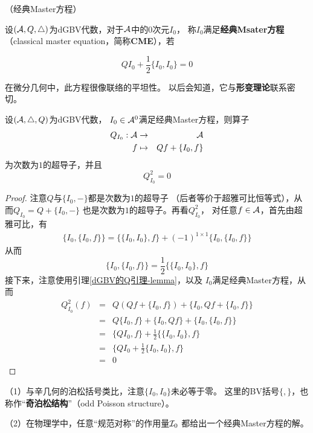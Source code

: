 \begin{definition}（经典Master方程）

设$(\mathcal{A},Q,\triangle)$为dGBV代数，对于$\mathcal{A}$中的$0$次元$I_0$，
称$I_0$满足\textbf{经典Msater方程}
（classical master equation，简称\textbf{CME}），若

$$QI_0+\frac{1}{2}\{I_0,I_0\}=0$$
\end{definition}

在微分几何中，此方程很像联络的平坦性。
以后会知道，它与\textbf{形变理论}联系密切。

\begin{lemma}
设$(\mathcal{A},\triangle,Q)$为dGBV代数，
$I_0\in\mathcal{A}^0$满足经典Master方程，则算子
\begin{eqnarray*}
Q_{I_0}:\mathcal{A}&\to&\mathcal{A}\\
f&\mapsto&Qf+\{I_0,f\}
\end{eqnarray*}
为次数为$1$的超导子，并且
$$Q_{I_0}^2=0$$
\end{lemma}

\begin{proof}
注意$Q$与$\{I_0,-\}$都是次数为$1$的超导子
（后者等价于超雅可比恒等式），从而$Q_{I_0}=Q+\{I_0,-\}$
也是次数为$1$的超导子。再看$Q_{I_0}^2$，
对任意$f\in\mathcal{A}$，首先由超雅可比，有
\begin{eqnarray*}
\{I_0,\{I_0,f\}\}=
\{\{I_0,I_0\},f\}+(-1)^{1\times 1}\{I_0,\{I_0,f\}\}
\end{eqnarray*}
从而
$$\{I_0,\{I_0,f\}\}=\frac{1}{2}\{\{I_0,I_0\},f\}$$
接下来，注意使用引理\ref{dGBV的Q引理-lemma}，以及
$I_0$满足经典Master方程，从而
\begin{eqnarray*}
     Q_{I_0}^2(f)
&=&
     Q\left(Qf+\{I_0,f\}\right)
    +\{I_0,Qf+\{I_0,f\}\}\\
&=&
     Q\{I_0,f\}+\{I_0,Qf\}+\{I_0,\{I_0,f\}\}\\
&=&
     \{QI_0,f\}+\frac{1}{2}\{\{I_0,I_0\},f\}\\
&=&
     \{QI_0+\frac{1}{2}\{I_0,I_0\},f\}\\
&=&
     0
\end{eqnarray*}
\end{proof}


\begin{rem}
（1）与辛几何的泊松括号类比，注意$\{I_0,I_0\}$未必等于零。
这里的BV括号$\{,\}$，也称作“\textbf{奇泊松结构}”（odd Poisson structure）。

（2）在物理学中，任意“规范对称”的作用量$\mathcal{I}_0$
都给出一个经典Master方程的解。
\end{rem}

